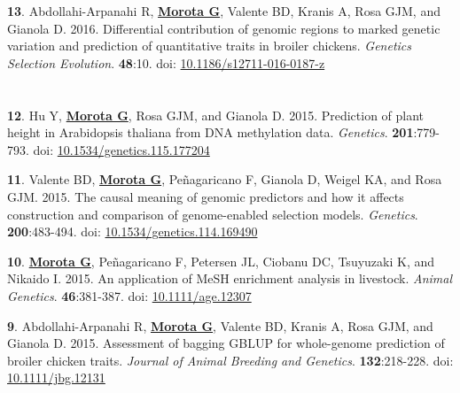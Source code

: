 \documentclass[margin,line,10pt]{res}
\newenvironment{list1}{
  \begin{list}{\ding{113}}{%
      \setlength{\itemsep}{0in}
      \setlength{\parsep}{0in} \setlength{\parskip}{0in}
      \setlength{\topsep}{0in} \setlength{\partopsep}{0in} 
      \setlength{\leftmargin}{0.17in}}}{\end{list}}
\begin{document}
\begin{resume}
\begin{list1}
\vspace{0.5cm}

  \item [{\bf 13}.] Abdollahi-Arpanahi R, {\bf \underline{Morota G}}, Valente BD, Kranis A, Rosa GJM, and Gianola D. 
  2016. Differential contribution of genomic regions to marked genetic variation and prediction of quantitative traits in broiler chickens. \emph{Genetics Selection Evolution}. \textbf{48}:10. doi: \textcolor{blue}{\href{http://dx.doi.org/10.1186/s12711-016-0187-z}{10.1186/s12711-016-0187-z}}

\end{list1}
  
\section{}

\begin{list1}

\item [{\bf 12}.]  Hu Y, {\bf \underline{Morota G}}, Rosa GJM, and Gianola D. 2015. Prediction of plant height in Arabidopsis thaliana from DNA methylation data. \emph{Genetics}. \textbf{201}:779-793. doi: \textcolor{blue}{\href{http://dx.doi.org/10.1534/genetics.115.177204}{10.1534/genetics.115.177204}} 

\vspace{0.5cm}

\item [{\bf 11}.]  Valente BD, {\bf \underline{Morota G}}, Pe\~{n}agaricano F, Gianola D, Weigel KA, and Rosa GJM. 2015. The causal meaning of genomic predictors and how it affects  construction and comparison of genome-enabled selection models. \emph{Genetics}. \textbf{200}:483-494. doi: \textcolor{blue}{\href{http://dx.doi.org/10.1534/genetics.114.169490}{10.1534/genetics.114.169490}} 

\vspace{0.5cm}

\item [{\bf 10}.] {\bf \underline{Morota G}}, Pe\~{n}agaricano F, Petersen JL, Ciobanu DC, Tsuyuzaki K, and Nikaido I. 2015. An application of MeSH enrichment analysis in livestock. \emph{Animal Genetics}. \textbf{46}:381-387. doi: \textcolor{blue}{\href{http://dx.doi.org/10.1111/age.12307}{10.1111/age.12307}} 

\vspace{0.5cm}

\item [{\bf 9}.] Abdollahi-Arpanahi R, {\bf \underline{Morota G}}, Valente BD, Kranis A, Rosa GJM, and Gianola D. 2015. Assessment of bagging GBLUP for whole-genome prediction of broiler chicken traits. \emph{Journal of Animal Breeding and Genetics}. \textbf{132}:218-228. doi: \textcolor{blue}{\href{http://dx.doi.org/10.1111/jbg.12131}{10.1111/jbg.12131}} 


\end{list1}
\end{resume}
\end{document}
